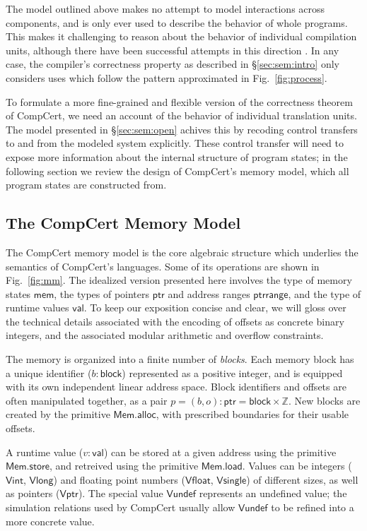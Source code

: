 \documentclass[sigplan,10pt,review,anonymous]{acmart}
\newcommand{\kw}[1]{\ensuremath{ \mathsf{#1} }}
\begin{document}
The model outlined above
makes no attempt to model interactions across components,
and is only ever used to
describe the behavior of whole programs.
This makes it challenging to reason about
the behavior of individual compilation units,
although there have been successful attempts in this direction
\cite{sepcompcert,gilhurslatest}.
In any case,
the compiler's correctness property
as described in \S\ref{sec:sem:intro}
only considers uses which follow
the pattern approximated in Fig.~\ref{fig:process}.

To formulate a more fine-grained and flexible
version of the correctness theorem of CompCert,
we need an account of
the behavior of individual translation units.
The model presented in \S\ref{sec:sem:open}
achives this by recoding control transfers
to and from the modeled system explicitly.
These control transfer will need to expose more information
about the internal structure of program states;
in the following section we review the design of
CompCert's memory model,
which all program states are constructed from.

\cbend

\subsection{The CompCert Memory Model} \label{sec:sem:mm} %

The CompCert memory model \cite{compcertmmv2}
is the core algebraic structure
which underlies the semantics of CompCert's languages.
Some of its operations
are shown in Fig.~\ref{fig:mm}.
The idealized version presented here
involves
the type of memory states \kw{mem},
the types of pointers \kw{ptr} and address ranges \kw{ptrrange}, and
the type of runtime values \kw{val}.
To keep our exposition concise and clear,
we will gloss over the technical details
associated with the encoding of offsets
as concrete binary integers,
and the associated modular arithmetic and overflow constraints.

The memory is organized into a finite number of \emph{blocks}.
Each memory block has a unique identifier ($b : \kw{block}$)
represented as a positive integer,
and is equipped with its own independent linear address space.
Block identifiers and offsets are often manipulated together,
as a pair $p = (b, o) : \kw{ptr} = \kw{block} \times \mathbb{Z}$.
New blocks are created by the primitive $\kw{Mem.alloc}$,
with prescribed boundaries for their usable offsets.

A runtime value ($v : \kw{val}$) can be stored at
a given address using the primitive \kw{Mem.store},
and retreived using the primitive \kw{Mem.load}.
Values can be integers (\kw{Vint}, \kw{Vlong}) and
floating point numbers (\kw{Vfloat}, \kw{Vsingle})
of different sizes,
as well as pointers (\kw{Vptr}).
The special value \kw{Vundef}
represents an undefined value;
the simulation relations used by CompCert
usually allow $\kw{Vundef}$
to be refined into a more concrete value.
\end{document}
